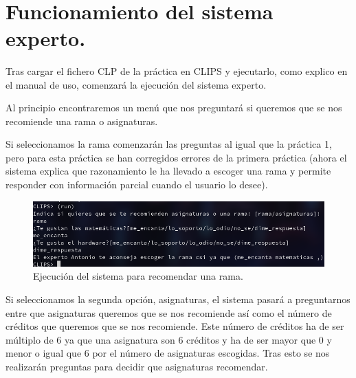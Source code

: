 \documentclass[12pt, spanish]{article}
\makeatletter
\let\thedate\@date
\makeatother
\begin{document}
\begin{titlepage}
    {\large \thedate}\\[0.5cm]
    {\doclicenseThis}
 	
    \vfill
    
\end{titlepage}


\tableofcontents
\pagebreak



\section{Funcionamiento del sistema experto.}

Tras cargar el fichero CLP de la práctica en CLIPS y ejecutarlo, como explico en el manual de uso, comenzará la ejecución del sistema experto.

Al principio encontraremos un menú que nos preguntará si queremos que se nos recomiende una rama o asignaturas.

Si seleccionamos la rama comenzarán las preguntas al igual que la práctica 1, pero para esta práctica se han corregidos errores de la primera práctica (ahora el sistema explica que razonamiento le ha llevado a escoger una rama y permite responder con información parcial cuando el usuario lo desee).


\begin{figure}[H]
	\centering
	\includegraphics[scale=0.45]{ej_rama.png}
	\caption{Ejecución del sistema para recomendar una rama.}
	\label{rama}
\end{figure}


Si seleccionamos la segunda opción, asignaturas, el sistema pasará a preguntarnos entre que asignaturas queremos que se nos recomiende así como el número de créditos que queremos que se nos recomiende. Este número de créditos ha de ser múltiplo de 6 ya que una asignatura son 6 créditos y ha de ser mayor que 0 y menor o igual que 6 por el número de  asignaturas escogidas. Tras esto se nos realizarán preguntas para decidir que asignaturas recomendar.
\end{document}
